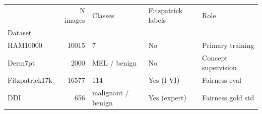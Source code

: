 \begin{tabular}{lrlll}
\toprule
 & N images & Classes & Fitzpatrick labels & Role \\
Dataset &  &  &  &  \\
\midrule
HAM10000 & 10015 & 7 & No & Primary training \\
Derm7pt & 2000 & MEL / benign & No & Concept supervision \\
Fitzpatrick17k & 16577 & 114 & Yes (I-VI) & Fairness eval \\
DDI & 656 & malignant / benign & Yes (expert) & Fairness gold std \\
\bottomrule
\end{tabular}
